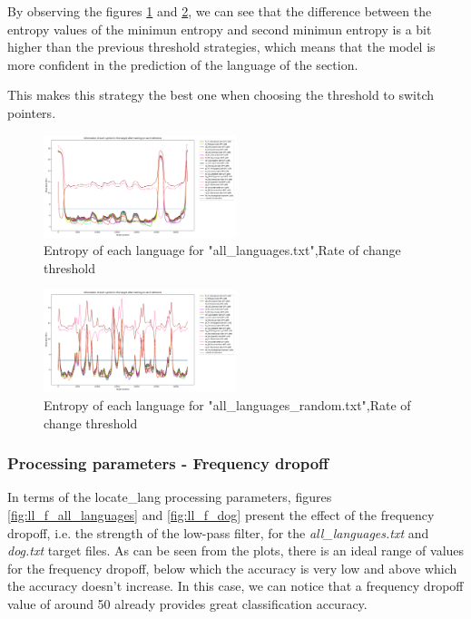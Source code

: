 \documentclass{article}
\begin{document}
By observing the figures \ref{fig:all_languages_t_c} and \ref{fig:all_languages_random_t_c}, we can see that the difference between the entropy values of the minimun entropy
and second minimun entropy is a bit higher than the previous threshold strategies, which means that the model is more confident in the prediction of the language of the section.

This makes this strategy the best one when choosing the threshold to switch pointers.

\begin{figure}
    \centering
    \includegraphics[width=0.5\textwidth]{../results/all_languages/-t_c:0.01.png}
    \caption{Entropy of each language for "all_languages.txt",Rate of change threshold}
    \label{fig:all_languages_t_c}
\end{figure}

\begin{figure}
    \centering
    \includegraphics[width=0.5\textwidth]{../results/all_languages_random/-t_c:0.01.png}
    \caption{Entropy of each language for "all_languages_random.txt",Rate of change threshold}
    \label{fig:all_languages_random_t_c}
\end{figure}

\subsubsection{Processing parameters - Frequency dropoff}
\label{subsubsec:results_locate_lang_frequency_dropoff}

In terms of the locate_lang processing parameters, figures \ref{fig:ll_f_all_languages} and \ref{fig:ll_f_dog} present the effect of the frequency dropoff, i.e. the strength of the low-pass filter, for the \textit{all_languages.txt} and \textit{dog.txt} target files.
As can be seen from the plots, there is an ideal range of values for the frequency dropoff, below which the accuracy is very low and above which the accuracy doesn't increase.
In this case, we can notice that a frequency dropoff value of around 50 already provides great classification accuracy.
\end{document}
